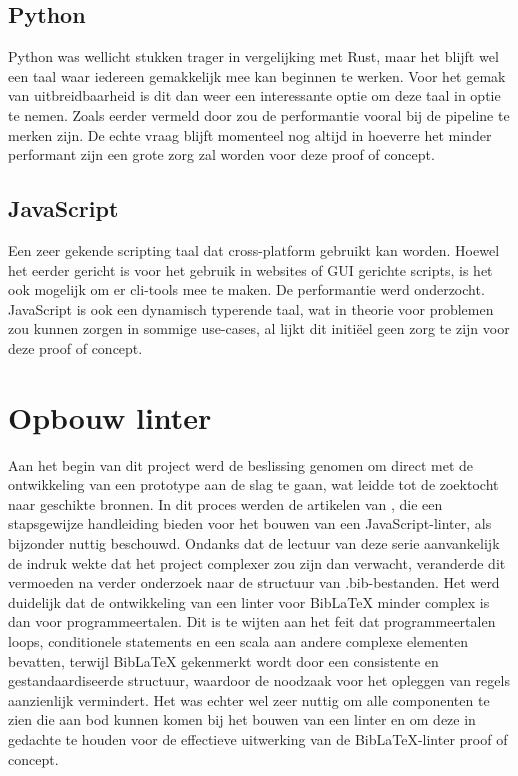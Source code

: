 \subsection{Python}
Python was wellicht stukken trager in vergelijking met Rust, maar het blijft wel een taal waar iedereen gemakkelijk mee kan beginnen te werken. Voor het gemak van uitbreidbaarheid is dit dan weer een interessante optie om deze taal in optie te nemen. Zoals eerder vermeld door \textcite{TurnerTrauring2023} zou de performantie vooral bij de pipeline te merken zijn.
De echte vraag blijft momenteel nog altijd in hoeverre het minder performant zijn een grote zorg zal worden voor deze proof of concept.

\subsection{JavaScript}
Een zeer gekende scripting taal dat cross-platform gebruikt kan worden. Hoewel het eerder gericht is voor het gebruik in websites of GUI gerichte scripts, is het ook mogelijk om er cli-tools mee te maken. De performantie werd onderzocht. JavaScript is ook een dynamisch typerende taal, wat in theorie voor problemen zou kunnen zorgen in sommige use-cases, al lijkt dit initiëel geen zorg te zijn voor deze proof of concept.\autocite{MDN2024}

\section{Opbouw linter}
Aan het begin van dit project werd de beslissing genomen om direct met de ontwikkeling van een prototype aan de slag te gaan, wat leidde tot de zoektocht naar geschikte bronnen. In dit proces werden de artikelen van \textcite{BorgesLate2021}, die een stapsgewijze handleiding bieden voor het bouwen van een JavaScript-linter, als bijzonder nuttig beschouwd. Ondanks dat de lectuur van deze serie aanvankelijk de indruk wekte dat het project complexer zou zijn dan verwacht, veranderde dit vermoeden na verder onderzoek naar de structuur van .bib-bestanden. Het werd duidelijk dat de ontwikkeling van een linter voor BibLaTeX minder complex is dan voor programmeertalen. Dit is te wijten aan het feit dat programmeertalen loops, conditionele statements en een scala aan andere complexe elementen bevatten, terwijl BibLaTeX gekenmerkt wordt door een consistente en gestandaardiseerde structuur, waardoor de noodzaak voor het opleggen van regels aanzienlijk vermindert. Het was echter wel zeer nuttig om alle componenten te zien die aan bod kunnen komen bij het bouwen van een linter en om deze in gedachte te houden voor de effectieve uitwerking van de BibLaTeX-linter proof of concept.